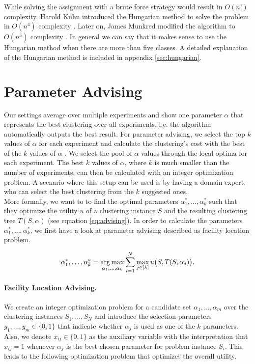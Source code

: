 While solving the assignment with a brute force strategy would result in $O(n!)$ complexity, Harold Kuhn introduced the Hungarian method to solve the problem in $O(n^4)$ complexity \cite{kuhn1955hungarian}. Later on, James Munkred modified the algorithm to $O(n^3)$ complexity \cite{munkres1957algorithms}. In general we can say that it  makes sense to use the Hungarian method when there are more than five classes. A detailed explanation of the Hungarian method is included in appendix \ref{sec:hungarian}.

\section{Parameter Advising}

Our settings average over multiple experiments and show one parameter $\alpha$ that represents the best clustering over all experiments, i.e. the algorithm automatically outputs the best result. For parameter advising, we select the top $k$ values of $\alpha$ for each experiment and calculate the clustering's cost with the best of the $k$ values of $\alpha$ \cite{deblasio2015parameter}. We select the pool of $\alpha$-values through the local optima for each experiment. The best $k$ values of $\alpha$, where $k$ is much smaller than the number of experiments, can then be calculated with an integer optimization problem. A scenario where this setup can be used is by having a domain expert, who can select the best clustering from the $k$ suggested ones.\\

More formally, we want to to find the optimal parameters $\alpha_1^*, \dots, \alpha_k^*$ such that they optimize the utility $u$ of a clustering instance $S$ and the resulting clustering tree $T(S, \alpha)$ (see equation \ref{eq:advising}). In order to calculate the parameters $\alpha_1^*, \dots, \alpha_k^*$, we first have a look at parameter advising described as facility location problem.

\begin{equation}
  \alpha_1^*, \dots, \alpha_k^*
  = \operatorname*{arg\,max}_{\alpha_1, \dots, \alpha_k} \sum_{i=1}^N \max_{j \in [k]} u\bigl(S, T(S, \alpha_j)\bigr).
  \label{eq:advising}
\end{equation}

\paragraph{Facility Location Advising.} We create an integer optimization problem for a candidate set $\alpha_1, \dots, \alpha_m$ over the clustering instances $S_1, \dots, S_N$ and introduce the selection parameters $y_1, \dots, y_m \in \{0, 1\}$ that indicate whether $\alpha_j$ is used as one of the $k$ parameters. Also, we denote $x_{ij} \in \{0, 1\}$ as the auxiliary variable with the interpretation that $x_{ij} = 1$ whenever $\alpha_j$ is the best chosen parameter for problem instance $S_i$. This leads to the following optimization problem that optimizes the overall utility.

